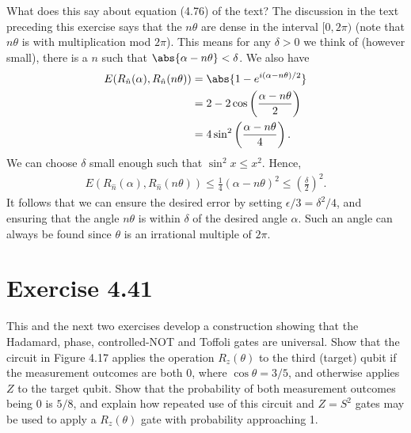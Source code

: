 \documentclass{book}
\begin{document}
    What does this say about equation (4.76) of the text? The discussion in the text preceding this exercise says that the $n \theta$ are dense in the interval $[0,2\pi)$ (note that $n \theta$ is with multiplication mod $2\pi$). This means for any $\delta > 0$ we think of (however small), there is a $n$ such that $\abs{\alpha - n \theta} < \delta$. We also have
    \begin{align}
    \begin{aligned}
        E(R_{\hat{n}}(\alpha), R_{\hat{n}}(n\theta)) &= \abs{1 - e^{i(\alpha - n \theta)/2}} \\
        &= 2 - 2 \cos\left(\frac{\alpha - n\theta}{2}\right) \\
        &= 4 \sin^2 \left(\frac{\alpha - n\theta}{4}\right).
    \end{aligned}
    \end{align}
    We can choose $\delta$ small enough such that $\sin^2 x \leq x^2$. Hence, 
    \begin{align}
         E(R_{\hat{n}}(\alpha), R_{\hat{n}}(n\theta)) \leq \frac{1}{4} (\alpha - n\theta)^2 \leq \left(\frac{\delta}{2}\right)^2.
    \end{align}
    It follows that we can ensure the desired error by setting $\epsilon/3 = \delta^2/4$, and ensuring that the angle $n \theta$ is within $\delta$ of the desired angle $\alpha$. Such an angle can always be found since $\theta$ is an irrational multiple of $2\pi$.

\section*{Exercise 4.41}
    This and the next two exercises develop a construction showing that the Hadamard, phase, controlled-NOT and Toffoli gates are universal. Show that the circuit in Figure 4.17 applies the operation $R_z(\theta)$ to the third (target) qubit if the measurement outcomes are both 0, where $\cos\theta = 3/5$, and otherwise applies $Z$ to the target qubit. Show that the probability of both measurement outcomes being 0 is $5/8$, and explain how repeated use of this circuit and $Z = S^2$ gates may be used to apply a $R_z(\theta)$ gate with probability approaching 1.
\end{document}
